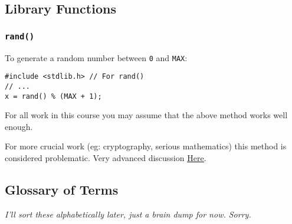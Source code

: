 \documentclass{lab}
\begin{document}
\begin{multicols}{2}
\subsection{Library Functions}
\subsubsection{\texttt{rand()}}

To generate a random number between \texttt{0} and \texttt{MAX}:

\begin{lstlisting}[style=CStyle]
#include <stdlib.h> // For rand()
// ...
x = rand() % (MAX + 1);
\end{lstlisting}

For all work in this course you may assume that the above method works well enough.

For more crucial work (eg: cryptography, serious mathematics) this method is considered problematic. Very advanced discussion \underline{\href{http://www.azillionmonkeys.com/qed/random.html}{Here}}.

\subsection{Glossary of Terms}

\textit{I'll sort these alphabetically later, just a brain dump for now. Sorry.}


\end{multicols}
\end{document}
